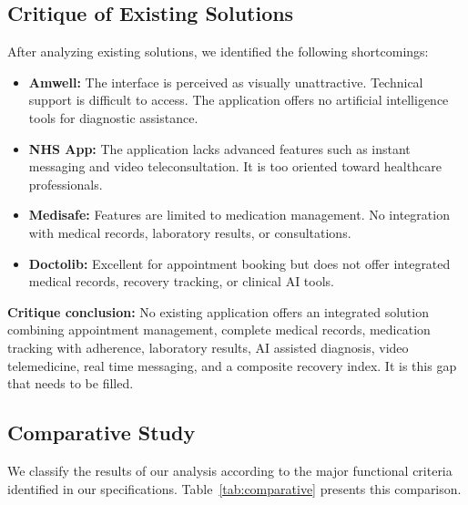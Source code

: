 \documentclass[12pt,a4paper,oneside]{report}
\begin{document}
\subsection{Critique of Existing Solutions}

After analyzing existing solutions, we identified the following shortcomings:

\begin{itemize}
    \item \textbf{Amwell:} The interface is perceived as visually unattractive. Technical support is difficult to access. The application offers no artificial intelligence tools for diagnostic assistance.
    \item \textbf{NHS App:} The application lacks advanced features such as instant messaging and video teleconsultation. It is too oriented toward healthcare professionals.
    \item \textbf{Medisafe:} Features are limited to medication management. No integration with medical records, laboratory results, or consultations.
    \item \textbf{Doctolib:} Excellent for appointment booking but does not offer integrated medical records, recovery tracking, or clinical AI tools.
\end{itemize}

\textbf{Critique conclusion:} No existing application offers an integrated solution combining appointment management, complete medical records, medication tracking with adherence, laboratory results, AI assisted diagnosis, video telemedicine, real time messaging, and a composite recovery index. It is this gap that needs to be filled.

\subsection{Comparative Study}

We classify the results of our analysis according to the major functional criteria identified in our specifications. Table~\ref{tab:comparative} presents this comparison.
\end{document}
